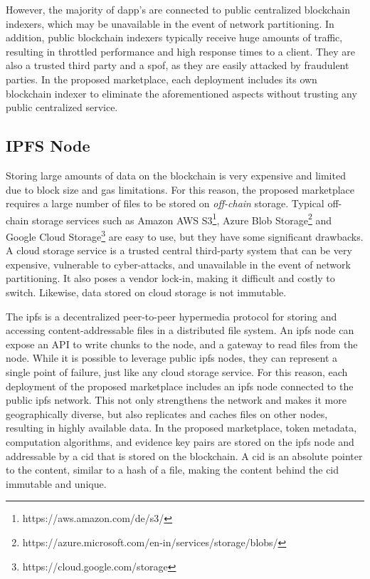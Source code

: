 However, the majority of \acrshort{dapp}'s are connected to public centralized blockchain indexers, which may be unavailable in the event of network partitioning. In addition, public blockchain indexers typically receive huge amounts of traffic, resulting in throttled performance and high response times to a client. They are also a trusted third party and a \acrfull{spof}, as they are easily attacked by fraudulent parties. In the proposed marketplace, each deployment includes its own blockchain indexer to eliminate the aforementioned aspects without trusting any public centralized service.
            
\subsection{IPFS Node}
\label{subsec:ipfs}

Storing large amounts of data on the blockchain is very expensive and limited due to block size and gas limitations. For this reason, the proposed marketplace requires a large number of files to be stored on \emph{off-chain} storage. Typical off-chain storage services such as Amazon AWS S3\footnote{https://aws.amazon.com/de/s3/}, Azure Blob Storage\footnote{https://azure.microsoft.com/en-in/services/storage/blobs/} and Google Cloud Storage\footnote{https://cloud.google.com/storage} are easy to use, but they have some significant drawbacks. A cloud storage service is a trusted central third-party system that can be very expensive, vulnerable to cyber-attacks, and unavailable in the event of network partitioning. It also poses a vendor lock-in, making it difficult and costly to switch. Likewise, data stored on cloud storage is not immutable.

The \acrfull{ipfs} is a decentralized peer-to-peer hypermedia protocol for storing and accessing content-addressable files in a distributed file system. An \acrshort{ipfs} node can expose an API to write chunks to the node, and a gateway to read files from the node. While it is possible to leverage public \acrshort{ipfs} nodes, they can represent a single point of failure, just like any cloud storage service. For this reason, each deployment of the proposed marketplace includes an \acrshort{ipfs} node connected to the public \acrshort{ipfs} network. This not only strengthens the network and makes it more geographically diverse, but also replicates and caches files on other nodes, resulting in highly available data. In the proposed marketplace, token metadata, computation algorithms, and evidence key pairs are stored on the \acrshort{ipfs} node and addressable by a \acrfull{cid} that is stored on the blockchain. A \acrshort{cid} is an absolute pointer to the content, similar to a hash of a file, making the content behind the \acrshort{cid} immutable and unique.

